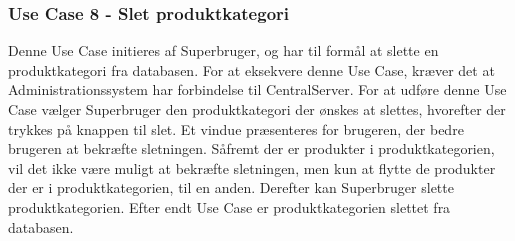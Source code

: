 \subsubsection{Use Case 8 - Slet produktkategori}
Denne Use Case initieres af Superbruger, og har til formål at slette en produktkategori fra databasen. For at eksekvere denne Use Case, kræver det at Administrationssystem har forbindelse til CentralServer. For at udføre denne Use Case vælger Superbruger den produktkategori der ønskes at slettes, hvorefter der trykkes på knappen til slet. Et vindue præsenteres for brugeren, der bedre brugeren at bekræfte sletningen. Såfremt der er produkter i produktkategorien, vil det ikke være muligt at bekræfte sletningen, men kun at flytte de produkter der er i produktkategorien, til en anden. Derefter kan Superbruger slette produktkategorien. Efter endt Use Case er produktkategorien slettet fra databasen.